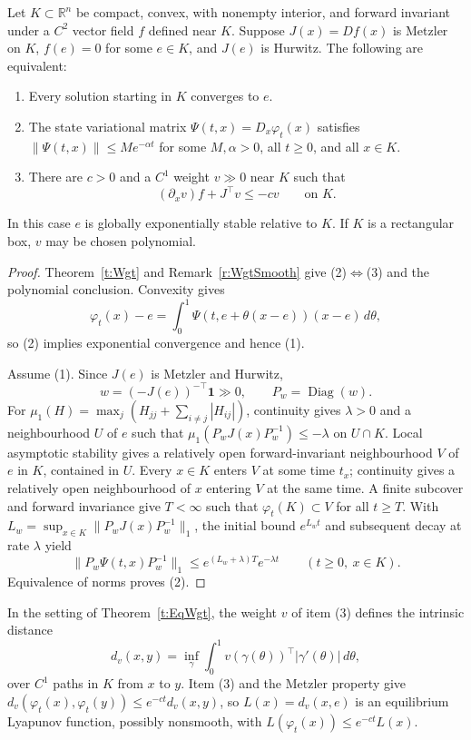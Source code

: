 Let $K\subset\mathbb R^n$ be compact, convex, with nonempty interior,
and forward invariant under a $C^2$ vector field $f$ defined near $K$.
Suppose $J(x)=Df(x)$ is Metzler on $K$, $f(e)=0$ for some $e\in K$,
and $J(e)$ is Hurwitz. The following are equivalent:
\begin{enumerate}
\item Every solution starting in $K$ converges to $e$.
\item The state variational matrix $\Psi(t,x)=D_x\varphi_t(x)$ satisfies
$\|\Psi(t,x)\|\le Me^{-\alpha t}$ for some $M,\alpha>0$, all $t\ge0$,
and all $x\in K$.
\item There are $c>0$ and a $C^1$ weight $v\gg0$ near $K$ such that
\[
 (\partial_xv)f+J^\top v\le-cv\qquad\text{on }K.
\]
\end{enumerate}
In this case $e$ is globally exponentially stable relative to $K$.
If $K$ is a rectangular box, $v$ may be chosen polynomial.
\eeT
\begin{proof}
Theorem~\ref{t:Wgt} and Remark~\ref{r:WgtSmooth} give (2)$\Leftrightarrow$(3)
and the polynomial conclusion. Convexity gives
\[
 \varphi_t(x)-e
 =\int_0^1\Psi(t,e+\theta(x-e))(x-e)\,d\theta,
\]
so (2) implies exponential convergence and hence (1).

Assume (1). Since $J(e)$ is Metzler and Hurwitz,
\[
 w=(-J(e))^{-\top}\mathbf1\gg0,\qquad P_w=\operatorname{Diag}(w).
\]
For $\mu_1(H)=\max_j(H_{jj}+\sum_{i\ne j}|H_{ij}|)$, continuity gives
$\lambda>0$ and a neighbourhood $U$ of $e$ such that
$\mu_1(P_wJ(x)P_w^{-1})\le-\lambda$ on $U\cap K$.
Local asymptotic stability gives a relatively open forward-invariant
neighbourhood $V$ of $e$ in $K$, contained in $U$.
Every $x\in K$ enters $V$ at some time $t_x$; continuity gives a
relatively open neighbourhood of $x$ entering $V$ at the same time.
A finite subcover and forward invariance give $T<\infty$ such that
$\varphi_t(K)\subset V$ for all $t\ge T$.
With $L_w=\sup_{x\in K}\|P_wJ(x)P_w^{-1}\|_1$, the initial bound
$e^{L_wt}$ and subsequent decay at rate $\lambda$ yield
\[
 \|P_w\Psi(t,x)P_w^{-1}\|_1
 \le e^{(L_w+\lambda)T}e^{-\lambda t}
 \qquad(t\ge0,\ x\in K).
\]
Equivalence of norms proves (2).
\end{proof}

In the setting of Theorem~\ref{t:EqWgt}, the weight $v$ of item (3) defines the intrinsic distance
\[
 d_v(x,y)=\inf_\gamma\int_0^1v(\gamma(\theta))^\top|\gamma'(\theta)|\,d\theta,
\]
over $C^1$ paths in $K$ from $x$ to $y$. Item (3) and the Metzler property give
$d_v(\varphi_t(x),\varphi_t(y))\le e^{-ct}d_v(x,y)$, so $L(x)=d_v(x,e)$ is an equilibrium Lyapunov
function, possibly nonsmooth, with $L(\varphi_t(x))\le e^{-ct}L(x)$.

